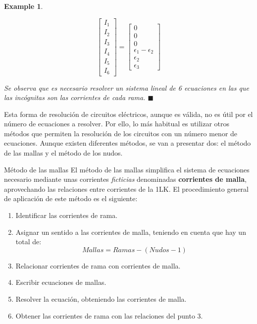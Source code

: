 \documentclass[11pt]{book} %
\makeatletter
\numberwithin{dummy}{section}
\theoremstyle{ocrenumbox}
\theoremstyle{blacknumex}
\newtheorem{exampleT}{Example}[chapter]
\theoremstyle{blacknumbox}
\theoremstyle{ocrenum}
\newenvironment{example}{\begin{exampleT}}{\hfill{\tiny\ensuremath{\blacksquare}}\end{exampleT}}
\renewcommand{\subsection}{\@startsection {subsection}{2}{\z@}
{-3ex \@plus -0.1ex \@minus -.4ex}
{0.5ex \@plus.2ex }
{\normalfont\sffamily\bfseries}}
\makeatother
\begin{document}
\begin{example}
\begin{enumerate}
\begin{equation*}
				\begin{bmatrix}
					I_1\\
					I_2\\
					I_3\\
					I_4\\
					I_5\\
					I_6    
				\end{bmatrix} = %
				\begin{bmatrix}
					0\\
					0\\
					0\\
					\epsilon_1 - \epsilon_2\\
					\epsilon_2\\
					\epsilon_3
				\end{bmatrix}
			\end{equation*}
		\end{enumerate}
		Se observa que es necesario resolver un sistema lineal de 6 ecuaciones en las que las incógnitas son las corrientes de cada rama. 
	\end{example}
	
	Esta forma de resolución de circuitos eléctricos, aunque es válida, no es útil por el número de ecuaciones a resolver. Por ello, lo más habitual es utilizar otros métodos que permiten la resolución de los circuitos con un número menor de ecuaciones. Aunque existen diferentes métodos, se van a presentar dos: el método de las mallas y el método de los nudos.
	
	\subsection{Método de las mallas}
	El método de las mallas simplifica el sistema de ecuaciones necesario mediante unas corrientes \emph{ficticias} denominadas \textbf{corrientes de malla}, aprovechando las relaciones entre corrientes de la 1LK. El procedimiento general de aplicación de este método es el siguiente:
	\begin{enumerate}
		\item Identificar las corrientes de rama.
		\item Asignar un sentido a las corrientes de malla, teniendo en cuenta que hay un total de:
		\begin{equation}
			\boxed{Mallas=Ramas-(Nudos-1)}
		\end{equation}
		\item Relacionar corrientes de rama con corrientes de malla.
		\item Escribir ecuaciones de mallas.
		\item Resolver la ecuación, obteniendo las corrientes de malla.
		\item Obtener las corrientes de rama con las relaciones del punto 3.
	\end{enumerate}
	
\end{document}

